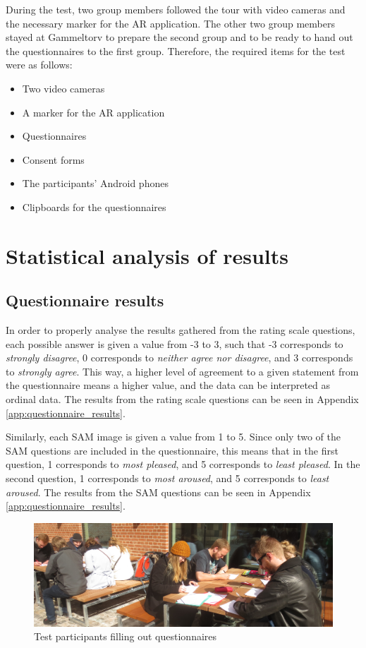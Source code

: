 During the test, two group members followed the tour with video cameras and the necessary marker for the AR application. The other two group members stayed at Gammeltorv to prepare the second group and to be ready to hand out the questionnaires to the first group. Therefore, the required items for the test were as follows:

\begin{itemize}
\item Two video cameras
\item A marker for the AR application
\item Questionnaires
\item Consent forms
\item The participants’ Android phones
\item Clipboards for the questionnaires
\end{itemize}

\section{Statistical analysis of results} 
\subsection{Questionnaire results}
In order to properly analyse the results gathered from the rating scale questions, each possible answer is given a value from -3 to 3, such that -3 corresponds to \textit{strongly disagree}, 0 corresponds to \textit{neither agree nor disagree}, and 3 corresponds to \textit{strongly agree}. This way, a higher level of agreement to a given statement from the questionnaire means a higher value, and the data can be interpreted as ordinal data. The results from the rating scale questions can be seen in Appendix \ref{app:questionnaire_results}.
 
Similarly, each SAM image is given a value from 1 to 5. Since only two of the SAM questions are included in the questionnaire, this means that in the first question, 1 corresponds to \textit{most pleased}, and 5 corresponds to \textit{least pleased}. In the second question, 1 corresponds to \textit{most aroused}, and 5 corresponds to \textit{least aroused}. The results from the SAM questions can be seen in Appendix \ref{app:questionnaire_results}.

\begin{figure}[h!]
   \centering
   \includegraphics[width=\textwidth]{figures/participants_questionnaire.jpg}
   \caption{Test participants filling out questionnaires}\label{fig:participants_questionnaire}
\end{figure}
 
